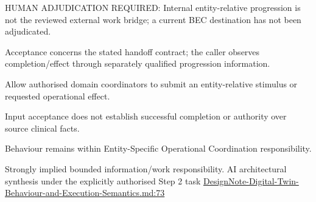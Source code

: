 HUMAN ADJUDICATION REQUIRED: Internal entity-relative progression is not the reviewed external work bridge; a current BEC destination has not been adjudicated.



Acceptance concerns the stated handoff contract; the caller observes completion/\allowbreak{}effect through separately qualified progression information.



Allow authorised domain coordinators to submit an entity-relative stimulus or requested operational effect.



Input acceptance does not establish successful completion or authority over source clinical facts.



Behaviour remains within Entity-Specific Operational Coordination responsibility.


Strongly implied bounded information/work responsibility. AI architectural synthesis under the explicitly authorised Step 2 task \hyperref[evidence:ec6250f7cf7c29a5]{DesignNote-Digital-Twin-Behaviour-and-Execution-Semantics.md:73}
